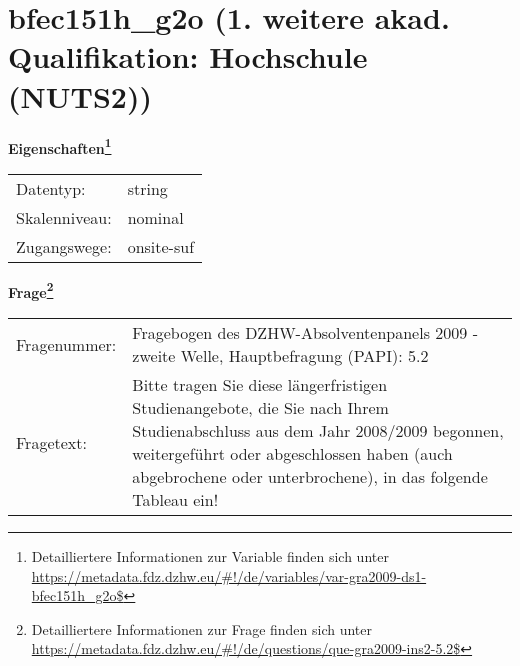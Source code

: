 
    \setcounter{footnote}{0}

    \vspace*{-1.8cm}
	\section{bfec151h\_g2o (1. weitere akad. Qualifikation: Hochschule (NUTS2))}
	\label{section:bfec151h_g2o}



    \vspace*{0.5cm}
    \noindent\textbf{Eigenschaften\footnote{Detailliertere Informationen zur Variable finden sich unter
		\url{https://metadata.fdz.dzhw.eu/\#!/de/variables/var-gra2009-ds1-bfec151h_g2o$}}}\\
	\begin{tabularx}{\hsize}{@{}lX}
	Datentyp: & string \\
	Skalenniveau: & nominal \\
	Zugangswege: &
	  onsite-suf
 \\
    \end{tabularx}



				\vspace*{0.5cm}
                \noindent\textbf{Frage\footnote{Detailliertere Informationen zur Frage finden sich unter
		              \url{https://metadata.fdz.dzhw.eu/\#!/de/questions/que-gra2009-ins2-5.2$}}}\\
				\begin{tabularx}{\hsize}{@{}lX}
					Fragenummer: &
					  Fragebogen des DZHW-Absolventenpanels 2009 - zweite Welle, Hauptbefragung (PAPI):
					  5.2
 \\
					Fragetext: & Bitte tragen Sie diese längerfristigen Studienangebote, die Sie nach Ihrem Studienabschluss aus dem Jahr 2008/2009 begonnen, weitergeführt oder abgeschlossen haben (auch abgebrochene oder unterbrochene), in das folgende Tableau ein! \\
				\end{tabularx}





